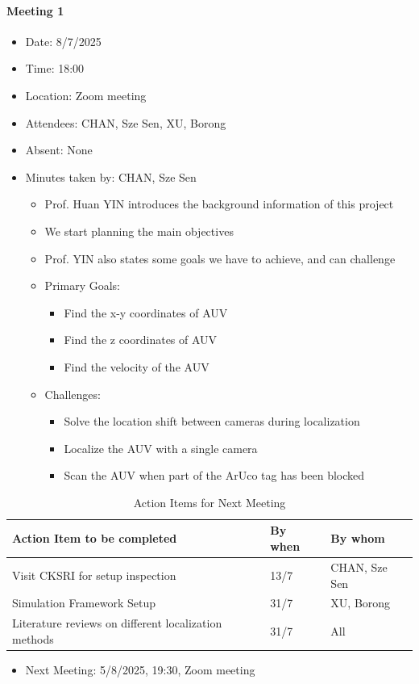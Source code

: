 \documentclass[11pt]{article}
\begin{document}
    \paragraph{Meeting 1}
    \begin{itemize}
        \item Date: 8/7/2025
        \item Time: 18:00
        \item Location: Zoom meeting
        \item Attendees: CHAN, Sze Sen, XU, Borong
        \item Absent: None
        \item Minutes taken by: CHAN, Sze Sen
        \begin{itemize}
            \item Prof. Huan YIN introduces the background information of this project 
            \item We start planning the main objectives
            \item Prof. YIN also states some goals we have to achieve, and can challenge
            \item Primary Goals:
            \begin{itemize}
                \item Find the x-y coordinates of AUV
                \item Find the z coordinates of AUV
                \item Find the velocity of the AUV
            \end{itemize}
            \item Challenges:
            \begin{itemize}
                \item Solve the location shift between cameras during localization
                \item Localize the AUV with a single camera
                \item Scan the AUV when part of the ArUco tag has been blocked
            \end{itemize}
        \end{itemize}
    \end{itemize}
    \begin{longtable}[c]{| l | l | l |}
        \caption{Action Items for Next Meeting\label{next meeting 1}}\\ 
        \hline
        \textbf{Action Item to be completed} & \textbf{By when} & \textbf{By whom}\\
        \hline
        Visit CKSRI for setup inspection & 13/7 & CHAN, Sze Sen\\
        \hline
        Simulation Framework Setup & 31/7 & XU, Borong\\
        \hline
        Literature reviews on different localization methods & 31/7 & All\\
        \hline
    \end{longtable}
    \begin{itemize}
        \item Next Meeting: 5/8/2025, 19:30, Zoom meeting
    \end{itemize}
    \newpage
\end{document}

